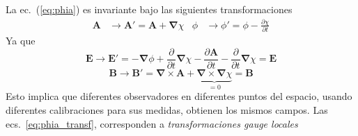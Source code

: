 La ec.~(\ref{eq:phia}) es invariante bajo las siguientes transformaciones
\begin{align}
  \label{eq:phia_transf}
  \mathbf{A}&\to\mathbf{A}'=\mathbf{A}+\boldsymbol{\nabla}\chi&
  \phi&\to\phi'=\phi-\frac{\partial\chi}{\partial t} 
\end{align}
Ya que
\begin{equation}
  \label{eq:Etrans}
  \mathbf{E}\to\mathbf{E}'= -\boldsymbol{\nabla}\phi+\frac{\partial}{\partial t}\boldsymbol{\nabla}\chi
  -\frac{\partial\mathbf{A}}{\partial t}-\frac{\partial}{\partial t}\boldsymbol{\nabla}\chi=\mathbf{E}
\end{equation}
\begin{equation}
  \label{eq:btransf}
  \mathbf{B}\to\mathbf{B}'= \boldsymbol{\nabla}\times\mathbf{A}+
  \underbrace{\boldsymbol{\nabla}\times\boldsymbol{\nabla}\chi}_{\displaystyle =0}=\mathbf{B}
\end{equation}
Esto implica que diferentes observadores en diferentes puntos del espacio, usando diferentes calibraciones para sus medidas, obtienen los mismos campos. Las  ecs.~\eqref{eq:phia_transf}, corresponden a \emph{transformaciones gauge locales}


